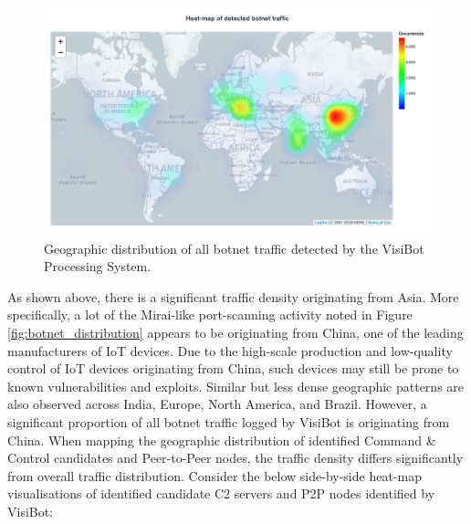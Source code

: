 \begin{figure}[!htb]
    \centering
    \includegraphics[width=1.0\linewidth]{results/all_heatmap.png}
    \caption{Geographic distribution of all botnet traffic detected by the VisiBot Processing System.}
    \label{fig:overall_heatmap} 
\end{figure}

As shown above, there is a significant traffic density originating from Asia. More specifically, a lot of the Mirai-like port-scanning activity noted in Figure \ref{fig:botnet_distribution} appears to be originating from China, one of the leading manufacturers of IoT devices. Due to the high-scale production and low-quality control of IoT devices originating from China, such devices may still be prone to known vulnerabilities and exploits. Similar but less dense geographic patterns are also observed across India, Europe, North America, and Brazil. However, a significant proportion of all botnet traffic logged by VisiBot is originating from China. When mapping the geographic distribution of identified Command \& Control candidates and Peer-to-Peer nodes, the traffic density differs significantly from overall traffic distribution. Consider the below side-by-side heat-map visualisations of identified candidate C2 servers and P2P nodes identified by VisiBot:

